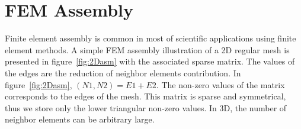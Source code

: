 \documentclass{IOS-Book-Article}
\begin{document}
\section{FEM Assembly}

Finite element assembly is common in most of scientific applications using finite element methods.
A simple FEM assembly illustration of a 2D regular mesh is presented in figure~\ref{fig:2Dasm} with the associated sparse matrix.
The values of the edges are the reduction of neighbor elements contribution. In figure~\ref{fig:2Dasm}, $(N1,N2) = E1 + E2$.
The non-zero values of the matrix corresponds to the edges of the mesh. This matrix is sparse and symmetrical, thus we store only the lower triangular non-zero values.
In 3D, the number of neighbor elements can be arbitrary large.
\end{document}
